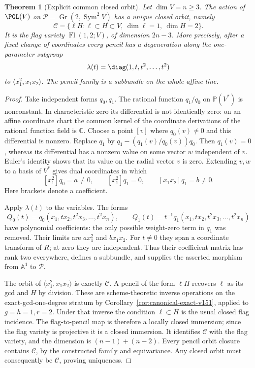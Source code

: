 \documentclass[11pt,reqno]{amsart}
\numberwithin{equation}{section}
\newtheorem{theorem}{Theorem}[section]
\theoremstyle{definition}\newtheorem{definition}[theorem]{Definition}
\theoremstyle{remark}\newtheorem{remark}[theorem]{Remark}
\newcommand{\C}{\mathbb C}\newcommand{\Q}{\mathbb Q}
\newcommand{\Pj}{\mathbb P}\newcommand{\A}{\mathbb A}
\DeclareMathOperator{\Sym}{Sym}\DeclareMathOperator{\Gr}{Gr}
\begin{document}
\begin{theorem}[Explicit common closed orbit]
\label{thm:closed-pencil-v151}
Let \(\dim V=n\geq3\).  The action of \(\PGL(V)\) on
\(\mathscr P=\Gr(2,\Sym^2V)\) has a unique closed orbit, namely
\begin{equation}\label{eq:flag-orbit-v151}
 \mathscr C=\{\ell H:\ell\subset H\subset V,\
                      \dim\ell=1,\ \dim H=2\}.
\end{equation}
It is the flag variety \(\operatorname{Fl}(1,2;V)\), of dimension
\(2n-3\).  More precisely, after a fixed change of coordinates every
pencil has a degeneration along the one-parameter subgroup
\[
                  \lambda(t)=\diag(1,t,t^2,\ldots,t^2)
\]
to \(\langle x_1^2,x_1x_2\rangle\).  The pencil family is a
subbundle on the whole affine line.
\end{theorem}
\begin{proof}
Take independent forms \(q_0,q_1\).  The rational function
\(q_1/q_0\) on \(\Pj(V^*)\) is nonconstant.  In characteristic
zero its differential is not identically zero: on an affine coordinate
chart the common kernel of the coordinate derivations of the rational
function field is \(\C\).  Choose a point \([v]\) where \(q_0(v)\ne0\)
and this differential is nonzero.  Replace \(q_1\) by
\(q_1-(q_1(v)/q_0(v))q_0\).  Then \(q_1(v)=0\), whereas its
differential has a nonzero value on some vector \(w\) independent of
\(v\).  Euler's identity shows that its value on the radial vector
\(v\) is zero.  Extending \(v,w\) to a basis of \(V^*\) gives dual
coordinates in which
\[
 [x_1^2]q_0=a\ne0,\qquad [x_1^2]q_1=0,
                                  \qquad [x_1x_2]q_1=b\ne0.
\]
Here brackets denote a coefficient.

Apply \(\lambda(t)\) to the variables.  The forms
\[
 Q_0(t)=q_0(x_1,tx_2,t^2x_3,\ldots,t^2x_n),\qquad
 Q_1(t)=t^{-1}q_1(x_1,tx_2,t^2x_3,\ldots,t^2x_n)
\]
have polynomial coefficients: the only possible weight-zero term in
\(q_1\) was removed.  Their limits are \(a x_1^2\) and
\(b x_1x_2\).  For \(t\ne0\) they span a coordinate transform of
\(R\); at zero they are independent.  Thus their coefficient matrix
has rank two everywhere, defines a subbundle, and supplies the asserted
morphism from \(\A^1\) to \(\mathscr P\).

The orbit of \(\langle x_1^2,x_1x_2\rangle\) is exactly
\(\mathscr C\).  A pencil of the form \(\ell H\) recovers \(\ell\)
as its gcd and \(H\) by division.  These are scheme-theoretic inverse
operations on the exact-gcd-one-degree stratum by
Corollary~\ref{cor:canonical-exact-v151}, applied to \(g=h=1,r=2\).
Under that inverse the condition \(\ell\subset H\) is the usual
closed flag incidence.  The flag-to-pencil map is therefore a locally
closed immersion; since the flag variety is projective it is a closed
immersion.  It identifies \(\mathscr C\) with the flag variety, and
the dimension is \((n-1)+(n-2)\).  Every pencil orbit closure contains
\(\mathscr C\), by the constructed family and equivariance.  Any
closed orbit must consequently be \(\mathscr C\), proving uniqueness.
\end{proof}
\end{document}
